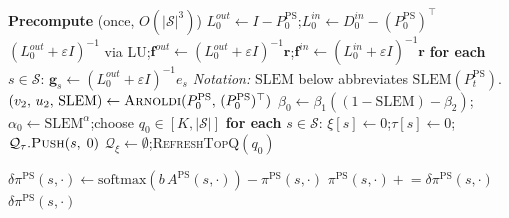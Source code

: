 \documentclass[10pt,a4paper]{article}
\begin{document}
\begin{algorithm}[!h]
\caption{GTA-PS Module}
\begin{algorithmic}[1]
\Statex \textbf{Precompute} (once, $O(|\mathcal{S}|^3)$) 
\State $L^{out}_0 \gets I - P^{\mathrm{PS}}_0$;\quad $L^{in}_0 \gets D^{in}_0 - (P^{\mathrm{PS}}_0)^\top$
\State $(L^{out}_0\!+\!\varepsilon I)^{-1}$ via LU;\quad $\mathbf{f}^{out} \gets (L^{out}_0+\varepsilon I)^{-1}\mathbf{r}$;\quad $\mathbf{f}^{in} \gets (L^{in}_0+\varepsilon I)^{-1}\mathbf{r}$
\State \textbf{for each} $s \in \mathcal{S}$: $\mathbf{g}_s \gets (L^{out}_0+\varepsilon I)^{-1}e_s$ 
\Statex \textit{Notation:} $\mathrm{SLEM}$ below abbreviates $\mathrm{SLEM}(P_t^{\mathrm{PS}})$.
\State $(v_2,\, u_2,\, \mathrm{SLEM}) \gets \textsc{Arnoldi}(P^{\mathrm{PS}}_0,\, (P^{\mathrm{PS}}_0)^\top)$
\State $\beta_0 \gets \beta_1((1-\mathrm{SLEM})-\beta_2)$;\quad $\alpha_0 \gets \mathrm{SLEM}^\alpha$;\quad choose $q_0 \in [K,|\mathcal{S}|]$
\State \textbf{for each} $s \in \mathcal{S}$: $\xi[s] \gets 0$;\quad $\tau[s] \gets 0$;\quad $\mathcal{Q}_{\tau}.\textsc{Push}(s,\;0)$
\State $\mathcal{Q}_{\xi} \gets \emptyset$;\quad \textsc{RefreshTopQ}$(q_0)$

\Statex
{} 
  \State $\delta\pi^{\mathrm{PS}}(s,\cdot) \gets \mathrm{softmax}(b\,A^{\mathrm{PS}}(s,\cdot)) - \pi^{\mathrm{PS}}(s,\cdot)$
  \State $\pi^{\mathrm{PS}}(s,\cdot) \mathrel{+}= \delta\pi^{\mathrm{PS}}(s,\cdot)$ 
  \State \Return $\delta\pi^{\mathrm{PS}}(s,\cdot)$
\EndProcedure


\end{algorithmic}
\end{algorithm}
\end{document}
